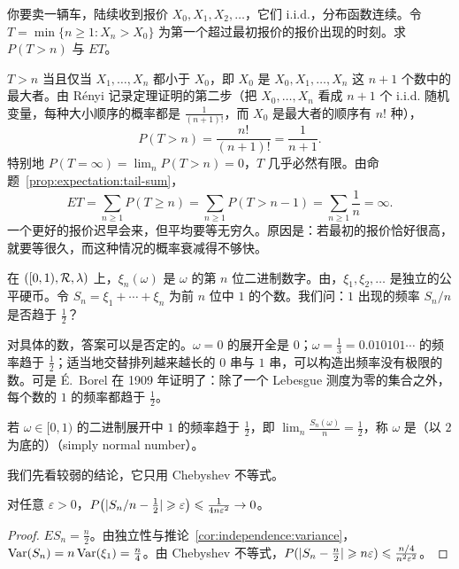 \begin{workedexample}[等待一个更好的报价]\label{we:independence:better-offer}
你要卖一辆车，陆续收到报价 $X_0,X_1,X_2,\dots$，它们 i.i.d.，分布函数连续。令 $T=\min\{n\geqslant1:X_n>X_0\}$ 为第一个超过最初报价的报价出现的时刻。求 $P(T>n)$ 与 $ET$。
\end{workedexample}
\begin{solution}
$T>n$ 当且仅当 $X_1,\dots,X_n$ 都小于 $X_0$，即 $X_0$ 是 $X_0,X_1,\dots,X_n$ 这 $n+1$ 个数中的最大者。由 Rényi 记录定理证明的第二步（把 $X_0,\dots,X_n$ 看成 $n+1$ 个 i.i.d. 随机变量，每种大小顺序的概率都是 $\frac1{(n+1)!}$，而 $X_0$ 是最大者的顺序有 $n!$ 种），
\[
P(T>n)=\frac{n!}{(n+1)!}=\frac1{n+1}.
\]
特别地 $P(T=\infty)=\lim_nP(T>n)=0$，$T$ 几乎必然有限。由命题~\ref{prop:expectation:tail-sum}，
\[
ET=\sum_{n\geqslant1}P(T\geqslant n)=\sum_{n\geqslant1}P(T>n-1)=\sum_{n\geqslant1}\frac1n=\infty .
\]
一个更好的报价迟早会来，但平均要等无穷久。原因是：若最初的报价恰好很高，就要等很久，而这种情况的概率衰减得不够快。
\end{solution}


在 $([0,1),\mathcal{R},\lambda)$ 上，$\xi_n(\omega)$ 是 $\omega$ 的第 $n$ 位二进制数字。由，$\xi_1,\xi_2,\dots$ 是独立的公平硬币。令 $S_n=\xi_1+\cdots+\xi_n$ 为前 $n$ 位中 $1$ 的个数。我们问：$1$ 出现的频率 $S_n/n$ 是否趋于 $\frac12$？

对具体的数，答案可以是否定的。$\omega=0$ 的展开全是 $0$；$\omega=\frac13=0.010101\cdots$ 的频率趋于 $\frac12$；适当地交替排列越来越长的 $0$ 串与 $1$ 串，可以构造出频率没有极限的数。可是 É.\ Borel 在 1909 年证明了：除了一个 Lebesgue 测度为零的集合之外，每个数的 $1$ 的频率都趋于 $\frac12$。

\begin{definition}[正规数]\label{def:independence:normal}
若 $\omega\in[0,1)$ 的二进制展开中 $1$ 的频率趋于 $\frac12$，即 $\lim_n\frac{S_n(\omega)}n=\frac12$，称 $\omega$ 是（以 $2$ 为底的）（simply normal number）。
\end{definition}

我们先看较弱的结论，它只用 Chebyshev 不等式。

\begin{proposition}\label{prop:independence:bernoulli}
对任意 $\varepsilon>0$，$P\bigl(\lvert S_n/n-\frac12\rvert\geqslant\varepsilon\bigr)\leqslant\frac1{4n\varepsilon^2}\to0$。
\end{proposition}
\begin{proof}
$ES_n=\frac n2$。由独立性与推论~\ref{cor:independence:variance}，$\operatorname{Var}(S_n)=n\operatorname{Var}(\xi_1)=\frac n4$。由 Chebyshev 不等式，$P(\lvert S_n-\frac n2\rvert\geqslant n\varepsilon)\leqslant\frac{n/4}{n^2\varepsilon^2}$。
\end{proof}


